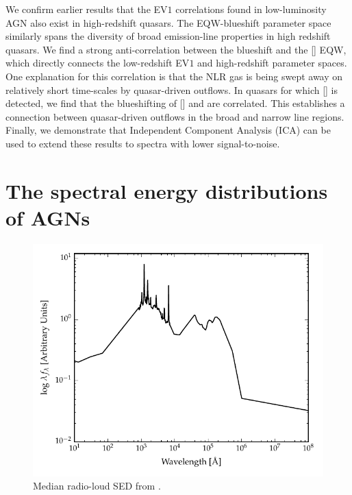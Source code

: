 We confirm earlier results that the EV$1$ correlations found in low-luminosity AGN also exist in high-redshift quasars. 
The  EQW-blueshift parameter space similarly spans the diversity of broad emission-line properties in high redshift quasars. 
We find a strong anti-correlation between the  blueshift and the [] EQW, which directly connects the low-redshift EV$1$ and high-redshift  parameter spaces.  
One explanation for this correlation is that the NLR gas is being swept away on relatively short time-scales by quasar-driven outflows. 
In quasars for which [] is detected, we find that the blueshifting of [] and  are correlated. 
This establishes a connection between quasar-driven outflows in the broad and narrow line regions.  
Finally, we demonstrate that Independent Component Analysis (ICA) can be used to extend these results to spectra with lower signal-to-noise. 

\section{The spectral energy distributions of AGNs}

\begin{figure}
  \centering
  \includegraphics[width=\textwidth]{figures/chapter05/shangsed.pdf}
  \caption{Median radio-loud SED from \citet{shang11}.}
  \label{fig:seyfert_sed}
\end{figure}

